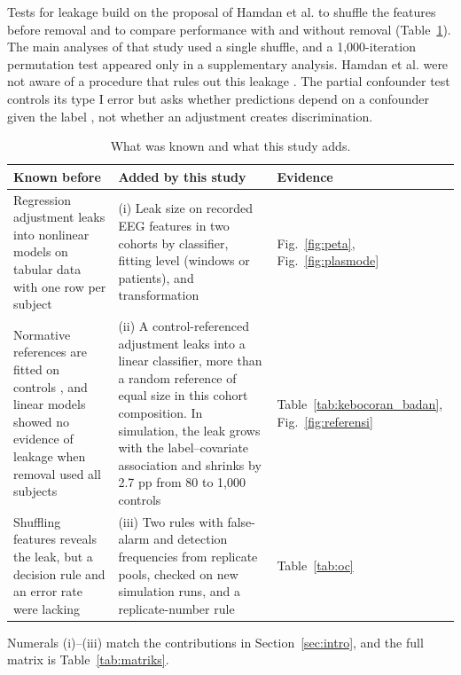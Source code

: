 \documentclass[final,1p,times]{elsarticle}
\newcommand{\tabref}[1]{Table~\ref{#1}}
\begin{document}
Tests for leakage build on the proposal of Hamdan et al. to shuffle the features before removal and to compare performance with and without removal (\tabref{tab:diketahui}). The main analyses of that study used a single shuffle, and a 1,000-iteration permutation test appeared only in a supplementary analysis. Hamdan et al. were not aware of a procedure that rules out this leakage \cite{hamdan2023}. The partial confounder test controls its type I error but asks whether predictions depend on a confounder given the label \cite{spisak2022}, not whether an adjustment creates discrimination.

\begin{table}[t]
\caption{What was known and what this study adds.}\label{tab:diketahui}
\centering\scriptsize
\setlength{\tabcolsep}{3pt}
\begin{tabular}{p{}p{}p{}}
\toprule
Known before & Added by this study & Evidence \\
\midrule
Regression adjustment leaks into nonlinear models on tabular data with one row per subject \cite{hamdan2023} & (i) Leak size on recorded EEG features in two cohorts by classifier, fitting level (windows or patients), and transformation & Fig.~\ref{fig:peta}, Fig.~\ref{fig:plasmode} \\
Normative references are fitted on controls \cite{rutherford2022,kia2022}, and linear models showed no evidence of leakage when removal used all subjects \cite{hamdan2023} & (ii) A control-referenced adjustment leaks into a linear classifier, more than a random reference of equal size in this cohort composition. In simulation, the leak grows with the label--covariate association and shrinks by 2.7 pp from 80 to 1,000 controls & \tabref{tab:kebocoran_badan}, Fig.~\ref{fig:referensi} \\
Shuffling features reveals the leak, but a decision rule and an error rate were lacking \cite{hamdan2023} & (iii) Two rules with false-alarm and detection frequencies from replicate pools, checked on new simulation runs, and a replicate-number rule & \tabref{tab:oc} \\
\bottomrule
\end{tabular}

\vspace{2pt}
\begin{minipage}{\textwidth}\footnotesize
Numerals (i)--(iii) match the contributions in Section~\ref{sec:intro}, and the full matrix is Table~\ref{tab:matriks}.
\end{minipage}
\end{table}%
\end{document}

